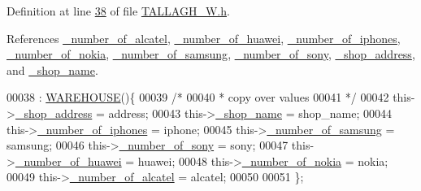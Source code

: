 Definition at line \hyperlink{_t_a_l_l_a_g_h___w_8h_source_l00038}{38} of file \hyperlink{_t_a_l_l_a_g_h___w_8h_source}{T\+A\+L\+L\+A\+G\+H\+\_\+\+W.\+h}.



References \hyperlink{_t_a_l_l_a_g_h___w_8h_source_l00117}{\+\_\+number\+\_\+of\+\_\+alcatel}, \hyperlink{_t_a_l_l_a_g_h___w_8h_source_l00115}{\+\_\+number\+\_\+of\+\_\+huawei}, \hyperlink{_t_a_l_l_a_g_h___w_8h_source_l00112}{\+\_\+number\+\_\+of\+\_\+iphones}, \hyperlink{_t_a_l_l_a_g_h___w_8h_source_l00116}{\+\_\+number\+\_\+of\+\_\+nokia}, \hyperlink{_t_a_l_l_a_g_h___w_8h_source_l00113}{\+\_\+number\+\_\+of\+\_\+samsung}, \hyperlink{_t_a_l_l_a_g_h___w_8h_source_l00114}{\+\_\+number\+\_\+of\+\_\+sony}, \hyperlink{_t_a_l_l_a_g_h___w_8h_source_l00110}{\+\_\+shop\+\_\+address}, and \hyperlink{_t_a_l_l_a_g_h___w_8h_source_l00111}{\+\_\+shop\+\_\+name}.


\begin{DoxyCode}
00038                                                                                                            
                       : \hyperlink{class_w_a_r_e_h_o_u_s_e_a7a924d389af91f54ed0e1d1d8d56ec57_a7a924d389af91f54ed0e1d1d8d56ec57}{WAREHOUSE}()\{
00039         \textcolor{comment}{/*}
00040 \textcolor{comment}{         * copy over values
}
00041 \textcolor{comment}{         */}
00042         this->\hyperlink{class_t_a_l_l_a_g_h___w_a268003f2cd359fa50c6061f1ad011c67_a268003f2cd359fa50c6061f1ad011c67}{\_shop\_address} = address;
00043         this->\hyperlink{class_t_a_l_l_a_g_h___w_a2d63785f290e8be76f3c4543e5df9508_a2d63785f290e8be76f3c4543e5df9508}{\_shop\_name} = shop\_name;
00044         this->\hyperlink{class_t_a_l_l_a_g_h___w_ad8a7847f895cd13b45331e4f3cd20c2e_ad8a7847f895cd13b45331e4f3cd20c2e}{\_number\_of\_iphones} = iphone;
00045         this->\hyperlink{class_t_a_l_l_a_g_h___w_a2438dbd2a390036bfd35f46a63b5b9bf_a2438dbd2a390036bfd35f46a63b5b9bf}{\_number\_of\_samsung} = samsung;
00046         this->\hyperlink{class_t_a_l_l_a_g_h___w_ab101d3ac8747eef48371cd9078d2366e_ab101d3ac8747eef48371cd9078d2366e}{\_number\_of\_sony} = sony;
00047         this->\hyperlink{class_t_a_l_l_a_g_h___w_ab966ff243f14eefc346e0b031f21c9b6_ab966ff243f14eefc346e0b031f21c9b6}{\_number\_of\_huawei} = huawei;
00048         this->\hyperlink{class_t_a_l_l_a_g_h___w_aa095820dca65526e795d64f31a3aaec1_aa095820dca65526e795d64f31a3aaec1}{\_number\_of\_nokia} = nokia;
00049         this->\hyperlink{class_t_a_l_l_a_g_h___w_a034f2ba8c42c1b81ae947b15732e5881_a034f2ba8c42c1b81ae947b15732e5881}{\_number\_of\_alcatel} = alcatel;
00050         
00051     \};
\end{DoxyCode}
